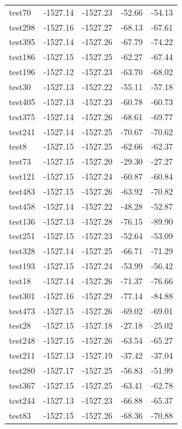 \documentclass[journal=jacsat,manuscript=article]{achemso}
\begin{document}
\begin{table}[b!]
\begin{tabular}{lrrrr}
test70  &  -1527.14 &  -1527.23 &  -52.66 &  -54.13 \\
test298 &  -1527.16 &  -1527.27 &  -68.13 &  -67.61 \\
test395 &  -1527.14 &  -1527.26 &  -67.79 &  -74.22 \\
test186 &  -1527.15 &  -1527.25 &  -62.27 &  -67.44 \\
test196 &  -1527.12 &  -1527.23 &  -63.70 &  -68.02 \\
test30  &  -1527.13 &  -1527.22 &  -55.11 &  -57.18 \\
test405 &  -1527.13 &  -1527.23 &  -60.78 &  -60.73 \\
test375 &  -1527.14 &  -1527.26 &  -68.61 &  -69.77 \\
test241 &  -1527.14 &  -1527.25 &  -70.67 &  -70.62 \\
test8   &  -1527.15 &  -1527.25 &  -62.66 &  -62.37 \\
test73  &  -1527.15 &  -1527.20 &  -29.30 &  -27.27 \\
test121 &  -1527.15 &  -1527.24 &  -60.87 &  -60.84 \\
test483 &  -1527.15 &  -1527.26 &  -63.92 &  -70.82 \\
test458 &  -1527.14 &  -1527.22 &  -48.28 &  -52.87 \\
test136 &  -1527.13 &  -1527.28 &  -76.15 &  -89.90 \\
test251 &  -1527.15 &  -1527.23 &  -52.64 &  -53.09 \\
test328 &  -1527.14 &  -1527.25 &  -66.71 &  -71.29 \\
test193 &  -1527.15 &  -1527.24 &  -53.99 &  -56.42 \\
test18  &  -1527.14 &  -1527.26 &  -71.37 &  -76.66 \\
test301 &  -1527.16 &  -1527.29 &  -77.14 &  -84.88 \\
test473 &  -1527.15 &  -1527.26 &  -69.02 &  -69.01 \\
test28  &  -1527.15 &  -1527.18 &  -27.18 &  -25.02 \\
test248 &  -1527.15 &  -1527.26 &  -63.54 &  -65.27 \\
test211 &  -1527.13 &  -1527.19 &  -37.42 &  -37.04 \\
test280 &  -1527.17 &  -1527.25 &  -56.83 &  -51.99 \\
test367 &  -1527.15 &  -1527.25 &  -63.41 &  -62.78 \\
test244 &  -1527.13 &  -1527.23 &  -66.88 &  -65.37 \\
test83  &  -1527.15 &  -1527.26 &  -68.36 &  -70.88 \\

\end{tabular}
\end{table}
\end{document}
